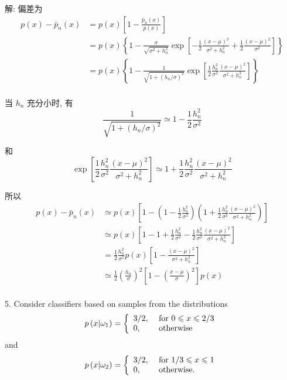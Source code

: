 \documentclass{article}
\begin{document}
解: 偏差为
\begin{equation}
  \begin{aligned}
    p(x)-\bar{p}_n(x)
    &=p(x)\left[1-\frac{\bar{p}_n(x)}{p(x)}\right]\\
    &=p(x)\left\{1-\frac{\sigma}{\sqrt{\sigma^2+h_n^2}}\exp\left[-\frac{1}{2}\frac{(x-\mu)^2}{\sigma^2+h_n^2}+\frac{1}{2}\frac{(x-\mu)^2}{\sigma^2}\right]\right\}\\
    &=p(x)\left\{1-\frac{1}{\sqrt{1+(h_n/\sigma)^2}}\exp\left[\frac{1}{2}\frac{h_n^2}{\sigma^2}\frac{(x-\mu)^2}{\sigma^2+h_n^2}\right]\right\}\\
  \end{aligned}
\end{equation}

当 $h_n$ 充分小时, 有
\begin{equation}
  \frac{1}{\sqrt{1+(h_n/\sigma)^2}}\simeq 1-\frac{1}{2}\frac{h_n^2}{\sigma^2}
\end{equation}

和
\begin{equation}
  \exp\left[\frac{1}{2}\frac{h_n^2}{\sigma^2}\frac{(x-\mu)^2}{\sigma^2+h_n^2}\right]\simeq 1+\frac{1}{2}\frac{h_n^2}{\sigma^2}\frac{(x-\mu)^2}{\sigma^2+h_n^2}
\end{equation}

所以
\begin{equation}
  \begin{aligned}
    p(x)-\bar{p}_n(x)
    &\simeq p(x)\left[1-\left(1-\frac{1}{2}\frac{h_n^2}{\sigma^2}\right)\left(1+\frac{1}{2}\frac{h_n^2}{\sigma^2}\frac{(x-\mu)^2}{\sigma^2+h_n^2}\right)\right]\\
    &\simeq p(x)\left[1-1+\frac{1}{2}\frac{h_n^2}{\sigma^2}-\frac{1}{2}\frac{h_n^2}{\sigma^2}\frac{(x-\mu)^2}{\sigma^2+h_n^2}\right]\\
    &=\frac{1}{2}\frac{h_n^2}{\sigma^2}p(x)\left[1-\frac{(x-\mu)^2}{\sigma^2+h_n^2}\right]\\
    &\simeq \frac{1}{2}\left(\frac{h_{n}}{\sigma}\right)^{2}\left[1-\left(\frac{x-\mu}{\sigma}\right)^{2}\right] p(x)\\
  \end{aligned}
\end{equation}

5. Consider classifiers based on samples from the distributions
\begin{equation}
  p\left(x|\omega_{1}\right)=
  \left\{
    \begin{array}{ll}
      3 / 2, & \text { for } 0 \leqslant x \leqslant 2 / 3 \\
      0,     & \text { otherwise }
    \end{array}
  \right.
\end{equation}
and
\begin{equation}
  p\left(x|\omega_{2}\right)=
  \left\{
    \begin{array}{ll}
      3 / 2, & \text { for } 1 / 3 \leqslant x \leqslant 1 \\
      0,     & \text { otherwise. }
    \end{array}
  \right.
\end{equation}
\end{document}
